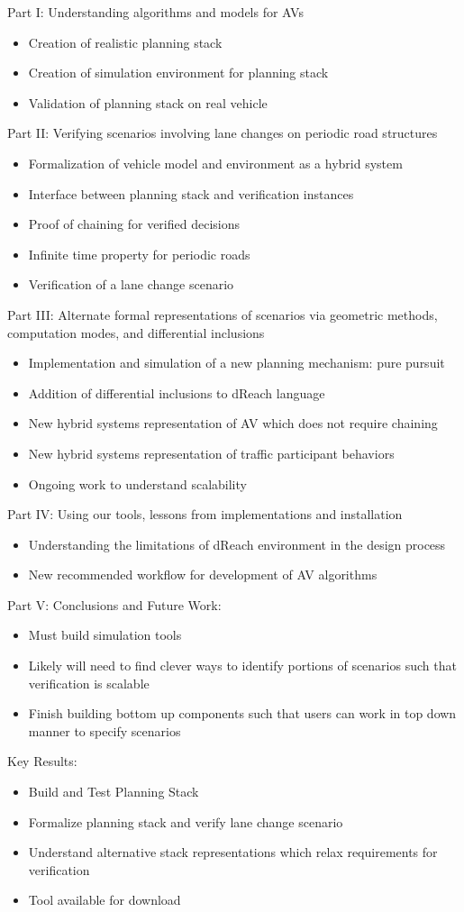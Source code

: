 
Part I: Understanding algorithms and models for AVs
\begin{itemize}
	\item Creation of realistic planning stack
	\item Creation of simulation environment for planning stack
	\item Validation of planning stack on real vehicle
\end{itemize}

Part II: Verifying scenarios involving lane changes on periodic road structures
\begin{itemize}
	\item Formalization of vehicle model and environment as a hybrid system
	\item Interface between planning stack and verification instances
	\item Proof of chaining for verified decisions
	\item Infinite time property for periodic roads
	\item Verification of a lane change scenario
\end{itemize}

Part III: Alternate formal representations of scenarios via geometric methods, computation modes, and differential inclusions
\begin{itemize}
	\item Implementation and simulation of a new planning mechanism: pure pursuit
	\item Addition of differential inclusions to dReach language
	\item New hybrid systems representation of AV which does not require chaining
	\item New hybrid systems representation of traffic participant behaviors
	\item Ongoing work to understand scalability
\end{itemize}

Part IV: Using our tools, lessons from implementations and installation
\begin{itemize}
	\item Understanding the limitations of dReach environment in the design process
	\item New recommended workflow for development of AV algorithms
\end{itemize}

Part V: Conclusions and Future Work:
\begin{itemize}
	\item Must build simulation tools
	\item Likely will need to find clever ways to identify portions of scenarios such that verification is scalable
	\item Finish building bottom up components such that users can work in top down manner to specify scenarios
\end{itemize}

Key Results:\\
\begin{itemize}
	\item Build and Test Planning Stack
	\item Formalize planning stack and verify lane change scenario
	\item Understand alternative stack representations which relax requirements for verification
	\item Tool available for download
\end{itemize}
